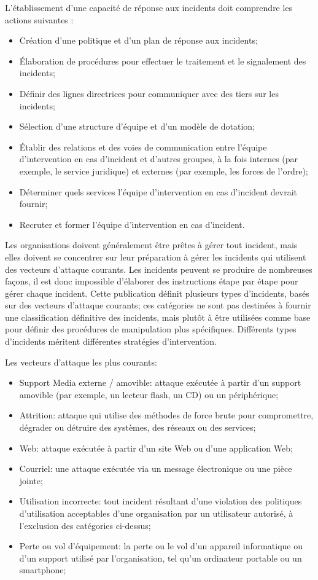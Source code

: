 L'établissement d'une capacité de réponse aux incidents doit comprendre les actions suivantes :

\begin{itemize}
  \item Création d'une politique et d'un plan de réponse aux incidents;
  \item  Élaboration de procédures pour effectuer le traitement et le signalement des incidents;
  \item Définir des lignes directrices pour communiquer avec des tiers sur les incidents;
   \item Sélection d'une structure d'équipe et d'un modèle de dotation;
  \item  Établir des relations et des voies de communication entre l'équipe d'intervention en cas d'incident et d'autres groupes, à la fois internes (par exemple, le service juridique) et externes (par exemple, les forces de l'ordre);
  \item Déterminer quels services l'équipe d'intervention en cas d'incident devrait fournir;
  \item Recruter et former l'équipe d'intervention en cas d'incident.
\end{itemize}


Les organisations doivent généralement être prêtes à gérer tout incident, mais elles doivent se concentrer sur leur préparation à gérer les incidents qui utilisent des vecteurs d'attaque courants.
Les incidents peuvent se produire de nombreuses façons, il est donc impossible d'élaborer des instructions étape par étape pour gérer chaque incident. Cette publication définit plusieurs types d'incidents, basés sur des vecteurs d'attaque courants; ces catégories ne sont pas destinées à fournir une classification définitive des incidents, mais plutôt à être utilisées comme base pour définir des procédures de manipulation plus spécifiques. Différents types d'incidents méritent différentes stratégies d'intervention. 

Les vecteurs d'attaque les plus courants:

\begin{itemize}
  \item Support Media externe / amovible: attaque exécutée à partir d'un support amovible (par exemple, un lecteur flash, un CD) ou un périphérique;
  \item Attrition: attaque qui utilise des méthodes de force brute pour compromettre, dégrader ou détruire des systèmes, des réseaux ou des services;
  \item Web: attaque exécutée à partir d'un site Web ou d'une application Web;
  \item Courriel: une attaque exécutée via un message électronique ou une pièce jointe;
  \item Utilisation incorrecte: tout incident résultant d'une violation des politiques d'utilisation acceptables d'une organisation par un utilisateur autorisé, à l'exclusion des catégories ci-dessus;
  \item  Perte ou vol d'équipement: la perte ou le vol d'un appareil informatique ou d'un support utilisé par l'organisation, tel qu'un ordinateur portable ou un smartphone;
\end{itemize}



